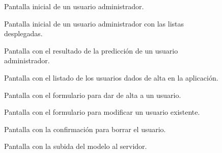 \begin{figure}[h]
	\caption{Pantalla inicial de un usuario administrador.}
	\label{fig:inicio}
\end{figure}

\begin{figure}[h]
	\caption{Pantalla inicial de un usuario administrador con las listas desplegadas.}
	\label{fig:inicio_1}
\end{figure}

\begin{figure}[h]
	\caption{Pantalla con el resultado de la predicción de un usuario administrador.}
	\label{fig:resultado}
\end{figure}

\begin{figure}[h]
	\caption{Pantalla con el listado de los usuarios dados de alta en la aplicación.}
	\label{fig:gestionar_usuarios}
\end{figure}

\begin{figure}[h]
	\caption{Pantalla con el formulario para dar de alta a un usuario.}
	\label{fig:agregar_usuario}
\end{figure}

\begin{figure}[h]
	\caption{Pantalla con el formulario para modificar un usuario existente.}
	\label{fig:modificar_usuario}
\end{figure}

\begin{figure}[h]
	\caption{Pantalla con la confirmación para borrar el usuario.}
	\label{fig:eliminar_usuario}
\end{figure}

\begin{figure}[h]
	\caption{Pantalla con la subida del modelo al servidor.}
	\label{fig:modificar_modelo}
\end{figure}
